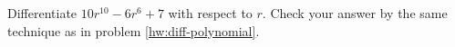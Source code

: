 Differentiate $10r^{10}-6r^6+7$ with respect to $r$.
Check your answer by the same
technique as in problem \ref{hw:diff-polynomial}.
\answercheck
